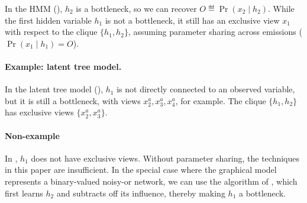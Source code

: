 In the HMM (),
$h_2$ is a bottleneck, so we can recover $O \eqdef \Pr(x_2 \mid h_2)$.
While the first hidden variable $h_1$
is not a bottleneck,
it still has an exclusive view $x_1$ with respect to the clique $\{h_1,h_2\}$,
assuming parameter sharing across emissions ($\Pr(x_1 \mid h_1) = O$).

\paragraph{Example: latent tree model.}

In the latent tree model (),
$h_1$ is not directly connected to an observed variable,
but it is still a bottleneck, with views $x^a_2, x^a_3, x^a_4$, for example.
The clique $\{h_1,h_2\}$ has exclusive views $\{x_2^a,x_3^a\}$.

\paragraph{Non-example}
\label{sec:non-example}

In ,
  $h_1$ does not have exclusive views.
  Without parameter sharing, the techniques in this paper
  are insufficient.
In the special case where the graphical model represents a binary-valued noisy-or network,
  we can use the algorithm of \citet{halpern13noisyor},
  which first learns $h_2$ and subtracts off its influence,
  thereby making $h_1$ a bottleneck.
